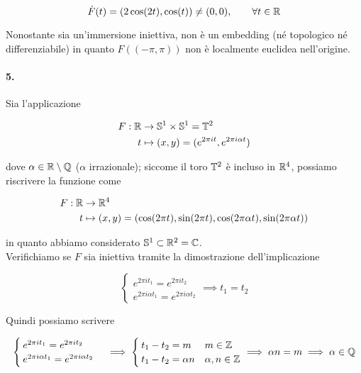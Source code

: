 \begin{equation}
	\dot{F}(t) = (2 \cos(2t), \cos(t)) \neq (0,0), \qquad \forall t \in \mathbb{R}
\end{equation}

Nonostante sia un'immersione iniettiva, non è un embedding (né topologico né differenziabile) in quanto $ F((-\pi,\pi)) $ non è localmente euclidea nell'origine.

\paragraph{5.}

Sia l'applicazione

\begin{align}
	\begin{split}
		F : \mathbb{R} &\to \mathbb{S}^{1} \times \mathbb{S}^{1} = \mathbb{T}^{2}\\
		t &\mapsto (x,y) = (e^{2 \pi i t}, e^{2 \pi i \alpha t})
	\end{split}
\end{align}

dove $ \alpha \in \mathbb{R} \setminus \mathbb{Q} $ ($ \alpha $ irrazionale); siccome il toro $ \mathbb{T}^{2} $ è incluso in $ \mathbb{R}^{4} $, possiamo riscrivere la funzione come

\begin{align}
	\begin{split}
		F : \mathbb{R} &\to \mathbb{R}^{4}\\
		t &\mapsto (x,y) = (\cos(2 \pi t), \sin(2 \pi t), \cos(2 \pi \alpha t), \sin(2 \pi \alpha t))
	\end{split}
\end{align}

in quanto abbiamo considerato $ \mathbb{S}^{1} \subset \mathbb{R}^{2} = \mathbb{C} $.\\
Verifichiamo se $ F $ sia iniettiva tramite la dimostrazione dell'implicazione

\begin{equation}
	\begin{cases}
		e^{2 \pi i t_{1}} = e^{2 \pi i t_{2}}\\
		e^{2 \pi i \alpha t_{1}} = e^{2 \pi i \alpha t_{2}}
	\end{cases}%
	\implies%
	t_{1} = t_{2}
\end{equation}

Quindi possiamo scrivere

\begin{equation}
	\begin{cases}
		e^{2 \pi i t_{1}} = e^{2 \pi i t_{2}}\\
		e^{2 \pi i \alpha t_{1}} = e^{2 \pi i \alpha t_{2}}
	\end{cases}%
	\implies%
	\begin{cases}
		t_{1} - t_{2} = m & m \in \Z\\
		t_{1} - t_{2} = \alpha n & \alpha,n \in \Z
	\end{cases}%
	\implies%
	\alpha n = m%
	\implies%
	\alpha \in \Q
\end{equation}

